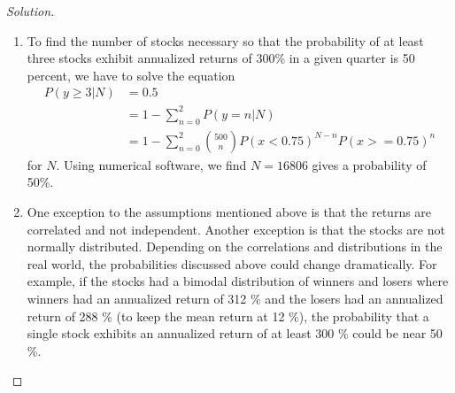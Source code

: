 \begin{proof}[Solution]
\begin{enumerate}[label=(\alph*)]
{}
  \item{To find the number of stocks necessary so that the probability of at least three stocks exhibit annualized returns of 300\% in a given quarter is 50 percent, we have to solve the equation
  \begin{align*}
   P(y\ge 3|N)  &= 0.5\\
		&= 1 - \sum_{n=0}^{2}P(y=n|N)\\
		&= 1 - \sum_{n=0}^{2}{500 \choose n}P(x<0.75)^{N-n}P(x>=0.75)^{n}
  \end{align*}
  for $N$. Using numerical software, we find $N=16806$ gives a probability of 50\%.
  }
  \item{One exception to the assumptions mentioned above is that the returns are correlated and not independent. Another exception is that the stocks are not normally distributed. Depending on the correlations and distributions in the real world, the probabilities discussed above could change dramatically. For example, if the stocks had a bimodal distribution of winners and losers where winners had an annualized return of 312 \% and the losers had an annualized return of 288 \% (to keep the mean return at 12 \%), the probability that a single stock exhibits an annualized return of at least 300 \% could be near 50 \%.}
  \end{enumerate}
  

\end{proof}
